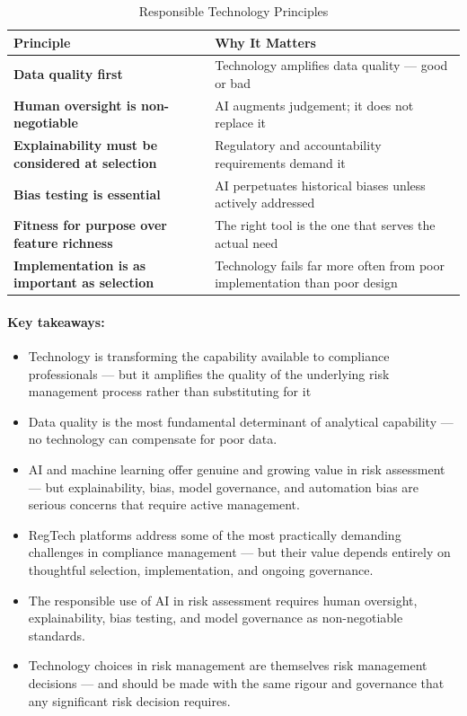 \begin{table}[H]
  \centering
  \renewcommand{\arraystretch}{1.5}
  \begin{tabularx}{\textwidth}{ | >{\raggedright\arraybackslash}p{} 
                                | >{\raggedright\arraybackslash}X | }
    \hline
    \textbf{Principle} & \textbf{Why It Matters} \\
    \hline
    \textbf{Data quality first} & Technology amplifies data quality — good or bad\\
    \hline
    \textbf{Human oversight is non-negotiable} & AI augments judgement; it does not replace it\\
    \hline
    \textbf{Explainability must be considered at selection} & Regulatory and accountability requirements demand it\\
    \hline
    \textbf{Bias testing is essential} & AI perpetuates historical biases unless actively addressed\\
    \hline
    \textbf{Fitness for purpose over feature richness} & The right tool is the one that serves the actual need\\
    \hline
    \textbf{Implementation is as important as selection} & Technology fails far more often from poor implementation than poor design\\
    \hline
  \end{tabularx}
  \caption{Responsible Technology Principles}
\end{table}

\paragraph{Key takeaways:}
\begin{itemize}
  \item{Technology is transforming the capability available to compliance professionals — but it amplifies the quality of the underlying risk management process rather than substituting for it}
  \item{Data quality is the most fundamental determinant of analytical capability — no technology can compensate for poor data.}
  \item{AI and machine learning offer genuine and growing value in risk assessment — but explainability, bias, model governance, and automation bias are serious concerns that require active management.}
  \item{RegTech platforms address some of the most practically demanding challenges in compliance management — but their value depends entirely on thoughtful selection, implementation, and ongoing governance.}
  \item{The responsible use of AI in risk assessment requires human oversight, explainability, bias testing, and model governance as non-negotiable standards.}
  \item{Technology choices in risk management are themselves risk management decisions — and should be made with the same rigour and governance that any significant risk decision requires.}
\end{itemize}

